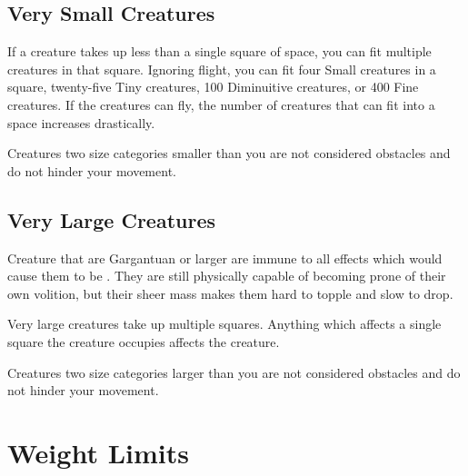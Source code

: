    \subsection{Very Small Creatures}
         If a creature takes up less than a single square of space, you can fit multiple creatures in that square.
        Ignoring flight, you can fit four Small creatures in a square, twenty-five Tiny creatures, 100 Diminuitive creatures, or 400 Fine creatures.
        If the creatures can fly, the number of creatures that can fit into a space increases drastically.

         Creatures two size categories smaller than you are not considered obstacles and do not hinder your movement.

    \subsection{Very Large Creatures}\label{Very Large Creatures}
        Creature that are Gargantuan or larger are immune to all effects which would cause them to be \prone.
        They are still physically capable of becoming prone of their own volition, but their sheer mass makes them hard to topple and slow to drop.

         Very large creatures take up multiple squares. Anything which affects a single square the creature occupies affects the creature.

         Creatures two size categories larger than you are not considered obstacles and do not hinder your movement.

\section{Weight Limits}\label{Weight Limits}

